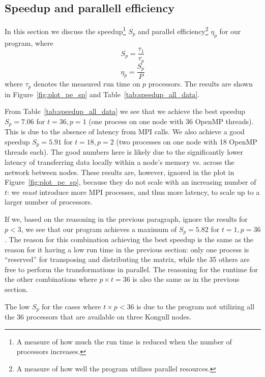 
\subsection{Speedup and parallell efficiency} %
\label{sub:speedup_and_parallell_efficiency}
In this section we discuss the speedup\footnote{A measure of how much the run time is reduced when the number of processors increases.} $S_p$  and parallel efficiency\footnote{A measure of how well the program utilizes parallel resources.} $\eta_p$ for our program, where
\begin{equation}
  S_p = \frac{\tau_1}{\tau_p}
\end{equation}
\begin{equation}
  \eta_p = \frac{S_p}{P}
\end{equation}
where $\tau_p$ denotes the measured run time on $p$ processors. The results are shown in Figure~\ref{fig:plot_pe_sp} and Table~\ref{tab:speedup_all_data}.

From Table~\ref{tab:speedup_all_data} we see that we achieve the best speedup $S_p=7.06$ for $t=36, p=1$ (one process on one node with 36 OpenMP threads). This is due to the absence of latency from MPI calls. We also achieve a good speedup $S_p=5.91$ for $t=18, p=2$ (two processes on one node with 18 OpenMP threads each). The good numbers here is likely due to the significantly lower latency of transferring data locally within a node's memory vs. across the network between nodes. These results are, however, ignored in the plot in Figure~\ref{fig:plot_pe_sp}, because they do not scale with an increasing number of $t$: we \emph{must} introduce more MPI processes, and thus more latency, to scale up to a larger number of processors.

If we, based on the reasoning in the previous paragraph, ignore the results for $p<3$,  we see that our program achieves a maximum of $S_p = 5.82$ for $t=1, p=36$. The reason for this  combination achieving the best speedup is the same as the reason for it having a low run time in the previous section: only one process is ``reserved'' for transposing and distributing the matrix, while the 35 others are free to perform the transformations in parallel. The reasoning for the runtime for the other combinations where $p\times t = 36$ is also the same as in the previous section.

The low $S_p$ for the cases where $t\times p < 36$ is due to the program not utilizing all the 36 processors that are available on three Kongull nodes.


